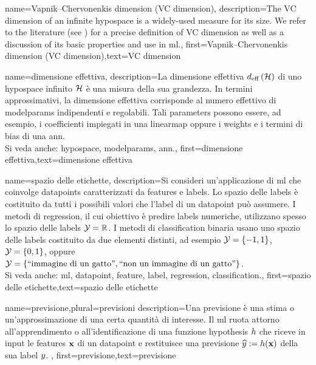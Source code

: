 {name={Vapnik–Chervonenkis dimension (VC dimension)},
	description={The VC dimension of an infinite \gls{hypospace} is a widely-used measure 
		for its size. We refer to the literature (see \cite{ShalevMLBook}) for a precise definition of VC dimension 
		as well as a discussion of its basic properties and use in \gls{ml}.},
	first={Vapnik–Chervonenkis dimension (VC dimension)},text={VC dimension}  
}

{name={dimensione effettiva},
	description={La dimensione effettiva $d_{\rm eff} \left( \mathcal{H} \right)$ di  
		uno \gls{hypospace} infinito $\mathcal{H}$ è una misura della sua grandezza. In termini approssimativi, la dimensione effettiva 
		corrisponde al numero effettivo di \glspl{modelparam} indipendenti e regolabili.
		Tali \glspl{parameter} possono essere, ad esempio, i coefficienti impiegati in una \gls{linearmap} oppure i \gls{weights} e i 
		termini di bias di una \gls{ann}.		
					\\ 
		Si veda anche: \gls{hypospace}, \glspl{modelparam}, \gls{ann}.},
	first={dimensione effettiva},text={dimensione effettiva}  
}

{name={spazio delle etichette},
	description={Si consideri un'applicazione di \gls{ml} che coinvolge \glspl{datapoint} caratterizzati da 
	\glspl{feature} e \glspl{label}. Lo spazio delle \glspl{label} è costituito da tutti i possibili valori che l'\gls{label} 
		di un \gls{datapoint} può assumere. I metodi di \gls{regression}, il cui obiettivo è predire \glspl{label} numeriche, 
		 utilizzano spesso lo spazio delle \glspl{label} $\mathcal{Y} = \mathbb{R}$. I metodi di \gls{classification} binaria usano uno 
		 spazio delle \glspl{label} costituito da due elementi distinti, ad esempio $\mathcal{Y} =\{-1,1\}$, $\mathcal{Y}=\{0,1\}$, 
		oppure $\mathcal{Y} = \{ \mbox{``immagine di un gatto''}, \mbox{``non un immagine di un gatto''} \}$.
					\\ 
		Si veda anche: \gls{ml}, \gls{datapoint}, \gls{feature}, \gls{label}, \gls{regression}, \gls{classification}.}, first={spazio delle etichette},text={spazio delle etichette}  
}

{name={previsione},plural={previsioni}
	description={Una previsione è una stima o un'approssimazione di una certa quantità di interesse.
		Il \gls{ml} ruota attorno all'apprendimento o all'identificazione di una funzione \gls{hypothesis} $h$ 
		che riceve in input le \glspl{feature} ${\bf x}$ di un \gls{datapoint} e restituisce una previsione 
		$\widehat{y} := h({\bf x})$ della sua \gls{label} $y$. },
	first={previsione},text={previsione}  
}


